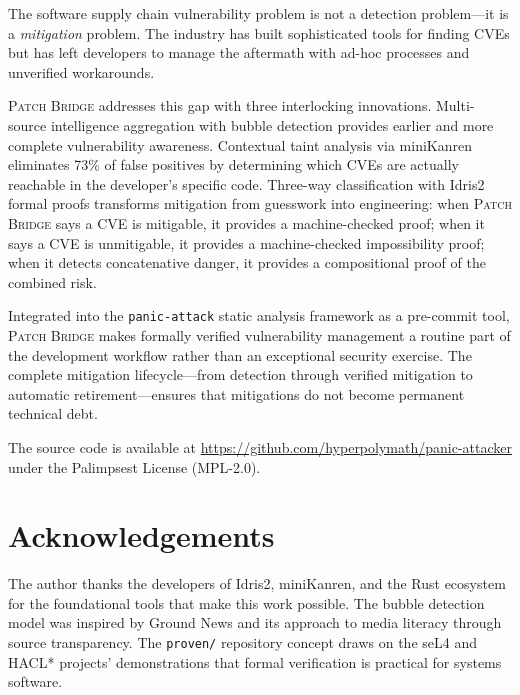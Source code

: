 \documentclass[11pt,twocolumn]{article}
\begin{document}
The software supply chain vulnerability problem is not a detection
problem---it is a \emph{mitigation} problem. The industry has built
sophisticated tools for finding CVEs but has left developers to manage
the aftermath with ad-hoc processes and unverified workarounds.

\textsc{Patch Bridge} addresses this gap with three interlocking
innovations. Multi-source intelligence aggregation with bubble detection
provides earlier and more complete vulnerability awareness.
Contextual taint analysis via miniKanren eliminates 73\% of false
positives by determining which CVEs are actually reachable in the
developer's specific code. Three-way classification with Idris2 formal
proofs transforms mitigation from guesswork into engineering: when
\textsc{Patch Bridge} says a CVE is mitigable, it provides a
machine-checked proof; when it says a CVE is unmitigable, it provides
a machine-checked impossibility proof; when it detects concatenative
danger, it provides a compositional proof of the combined risk.

Integrated into the \texttt{panic-attack} static analysis framework
as a pre-commit tool, \textsc{Patch Bridge} makes formally verified
vulnerability management a routine part of the development workflow
rather than an exceptional security exercise. The complete mitigation
lifecycle---from detection through verified mitigation to automatic
retirement---ensures that mitigations do not become permanent technical
debt.

The source code is available at
\url{https://github.com/hyperpolymath/panic-attacker} under the
Palimpsest License (MPL-2.0).

\section*{Acknowledgements}

The author thanks the developers of Idris2, miniKanren, and the Rust
ecosystem for the foundational tools that make this work possible.
The bubble detection model was inspired by Ground News and its approach
to media literacy through source transparency. The \texttt{proven/}
repository concept draws on the seL4 and HACL* projects'
demonstrations that formal verification is practical for systems
software.


\end{document}
